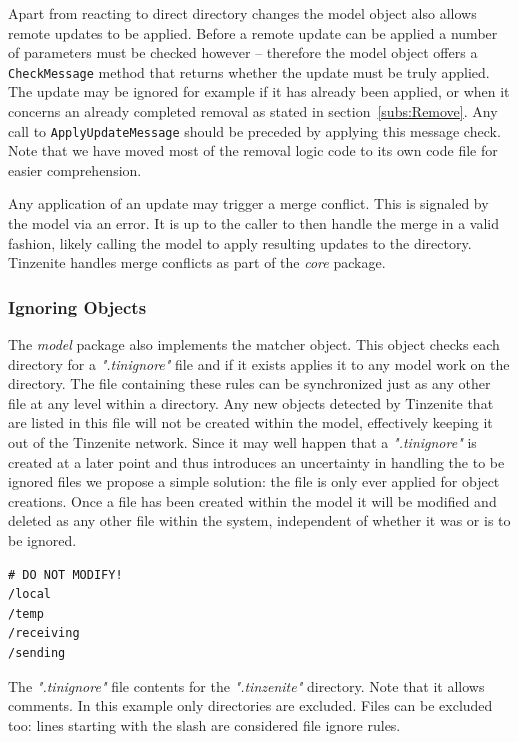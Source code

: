 Apart from reacting to direct directory changes the model object also allows remote updates to be applied.
Before a remote update can be applied a number of parameters must be checked however -- therefore the model object offers a \texttt{CheckMessage} method that returns whether the update must be truly applied.
The update may be ignored for example if it has already been applied, or when it concerns an already completed removal as stated in section~\ref{subs:Remove}.
Any call to \texttt{ApplyUpdateMessage} should be preceded by applying this message check.
Note that we have moved most of the removal logic code to its own code file for easier comprehension.

Any application of an update may trigger a merge conflict.
This is signaled by the model via an error.
It is up to the caller to then handle the merge in a valid fashion, likely calling the model to apply resulting updates to the directory.
Tinzenite handles merge conflicts as part of the \emph{core} package.

\subsubsection{Ignoring Objects}
\label{subs:Ignoring Objects}

The \emph{model} package also implements the matcher object.
This object checks each directory for a \textit{".tinignore"} file and if it exists applies it to any model work on the directory.
The file containing these rules can be synchronized just as any other file at any level within a directory.
Any new objects detected by Tinzenite that are listed in this file will not be created within the model, effectively keeping it out of the Tinzenite network.
Since it may well happen that a \textit{".tinignore"} is created at a later point and thus introduces an uncertainty in handling the to be ignored files we propose a simple solution: the file is only ever applied for object creations.
Once a file has been created within the model it will be modified and deleted as any other file within the system, independent of whether it was or is to be ignored.

\begin{listing}[htp]
    \begin{lstlisting}[language=golang,firstnumber=0]
# DO NOT MODIFY!
/local
/temp
/receiving
/sending
    \end{lstlisting}
\caption[Meta Ignore File]{The \textit{".tinignore"} file contents for the \textit{".tinzenite"} directory. Note that it allows comments. In this example only directories are excluded. Files can be excluded too: lines starting with the slash are considered file ignore rules.}
\label{tinignore:meta}
\end{listing}

